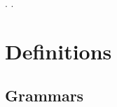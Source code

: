 \documentclass[12pt]{report}
\begin{document}

\begin{coqdoccode}
\coqdocemptyline
\coqdocnoindent
{}.\coqdoceol
\coqdocnoindent
{}  .\coqdoceol
\coqdocemptyline
\end{coqdoccode}
\section{Definitions}

\begin{coqdoccode}
\coqdocemptyline
\end{coqdoccode}
\subsection{Grammars}
\end{document}
